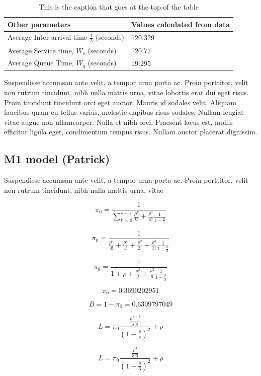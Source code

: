 \documentclass{article}
\begin{document}
\begin{table}[h!]
    \centering
    \caption{This is the caption that goes at the top of the table}
    \begin{tabu}{*{2}{X[c]}}
        \toprule
        \textbf{Other parameters} & \textbf{Values calculated from data} \\
        \midrule
        Average Inter-arrival time $\frac{1}{\lambda}$ (seconds) & 120.329  \\
        Average Service time, $W_s$ (seconds) & 120.77  \\
        Average Queue Time, $W_q$ (seconds) & 19.295  \\
        \bottomrule
    \end{tabu}
    \label{tab:Original Data Other}
\end{table}



Suspendisse accumsan ante velit, a tempor urna porta ac. Proin porttitor, velit non rutrum tincidunt, nibh nulla mattis urna, vitae lobortis erat dui eget risus. Proin tincidunt tincidunt orci eget auctor. Mauris id sodales velit. Aliquam faucibus quam eu tellus varius, molestie dapibus risus sodales. Nullam feugiat vitae augue non ullamcorper. Nulla et nibh orci. Praesent lacus est, mollis efficitur ligula eget, condimentum tempus risus. Nullam auctor placerat dignissim.

\subsection{M1 model (Patrick)}

Suspendisse accumsan ante velit, a tempor urna porta ac. Proin porttitor, velit non rutrum tincidunt, nibh nulla mattis urna, vitae 

$$
\pi_{0} = \frac{1}{\sum_{k=0}^{s-1}{\frac{\rho^k}{k!}} + \frac{\rho^s}{s!}\frac{1}{1-\frac{\rho}{s}}}
$$

$$
\pi_{0} = \frac{1}{\frac{\rho^0}{0!} + \frac{\rho^1}{1!} + \frac{\rho^2}{2!} + \frac{\rho^3}{3!}\frac{1}{1-\frac{\rho}{3}}}
$$

$$
\pi_{0} = \frac{1}{1 + \rho + \frac{\rho^2}{2} + \frac{\rho^3}{6}\frac{1}{1-\frac{\rho}{3}}}
$$

$$
\pi_{0} = 0.3690202951
$$

$$
B = 1-\pi_{0} = 0.6309797049
$$

$$
L = \pi_{0}\frac{\frac{\rho^{s+1}}{s!s}}{(1-\frac{\rho}{s})^2}+\rho
$$

$$
L = \pi_{0}\frac{\frac{\rho^{4}}{3!3}}{(1-\frac{\rho}{3})^2}+\rho
$$
\end{document}
